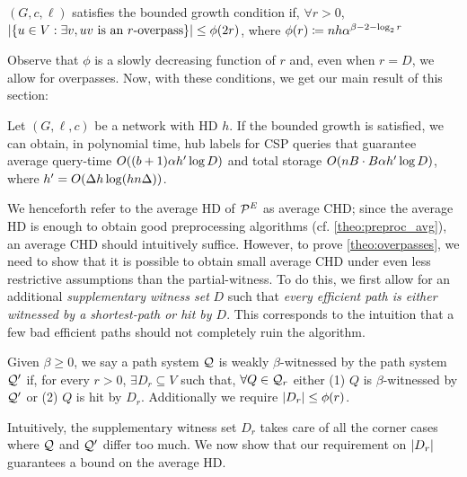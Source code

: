 \begin{definition}
$(G,c,\ell)$ satisfies the bounded growth condition if, $\forall r>0$, $\lvert\{u\in V: \exists v, uv \text{ is an $r$-overpass}\}\rvert\leq \phi(2r)$, where $\phi(r)\coloneqq nh\alpha^{\beta-2-\log_2r}$
\end{definition}

Observe that $\phi$ is a slowly decreasing function of $r$ and, even when $r=D$, we allow for overpasses.
Now, with these conditions, we get our main result of this section:


\begin{theorem}\label{theo:overpasses}
Let $(G,\ell,c)$ be a network with HD $h$.
If the bounded growth is satisfied, we can obtain, in polynomial time, hub labels for CSP queries that guarantee average query-time $O((b+1)\alpha h'\log D)$ and total storage $O(nB\cdot B\alpha h'\log D)$, where $h'=O(\Delta h\log(hn\Delta))$.
\end{theorem}

We henceforth refer to the average HD of $\mathcal{P}^E$ as average CHD; since the average HD is enough to obtain good preprocessing algorithms (cf. \cref{theo:preproc_avg}), an average CHD should intuitively suffice.
However, to prove \cref{theo:overpasses}, we need to show that it is possible to obtain small average CHD under even less restrictive assumptions than the partial-witness.
To do this, we first allow for an additional \emph{supplementary witness set} $D$ such that \emph{every efficient path is either witnessed by a shortest-path or hit by $D$}.
This corresponds to the intuition that a few bad efficient paths should not completely ruin the algorithm. 

\begin{definition}
Given $\beta\geq 0$, we say a path system  $\mathcal{Q}$ is weakly $\beta$-witnessed by the path system $\mathcal{Q}'$ if, for every $r>0$, $\exists D_r\subseteq V$ such that, $\forall Q\in \mathcal{Q}_r$ either (1) $Q$ is $\beta$-witnessed by $\mathcal{Q}'$ or (2) $Q$ is hit by $D_r$.
Additionally we require $\lvert D_r\rvert\leq \phi(r)$.
\end{definition} 

Intuitively, the supplementary witness set $D_r$ takes care of all the corner cases where $\mathcal{Q}$ and $\mathcal{Q}'$ differ too much.
We now show that our requirement on $\lvert D_r\rvert$ guarantees a bound on the average HD.

